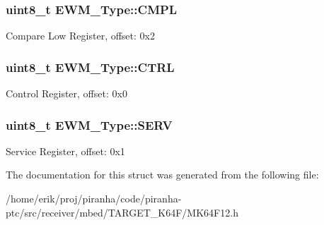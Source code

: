 \subsubsection[{\texorpdfstring{C\+M\+PL}{CMPL}}]{ uint8\+\_\+t E\+W\+M\+\_\+\+Type\+::\+C\+M\+PL}\hypertarget{structEWM__Type_a9b687b81f145fcac20991b7302df9f55}{}\label{structEWM__Type_a9b687b81f145fcac20991b7302df9f55}
Compare Low Register, offset\+: 0x2 
\subsubsection[{\texorpdfstring{C\+T\+RL}{CTRL}}]{ uint8\+\_\+t E\+W\+M\+\_\+\+Type\+::\+C\+T\+RL}\hypertarget{structEWM__Type_a34e0683325e0f6e1eff6c5429087c5b3}{}\label{structEWM__Type_a34e0683325e0f6e1eff6c5429087c5b3}
Control Register, offset\+: 0x0 
\subsubsection[{\texorpdfstring{S\+E\+RV}{SERV}}]{ uint8\+\_\+t E\+W\+M\+\_\+\+Type\+::\+S\+E\+RV}\hypertarget{structEWM__Type_a8b8265f982b05d0280305caedc159e37}{}\label{structEWM__Type_a8b8265f982b05d0280305caedc159e37}
Service Register, offset\+: 0x1 

The documentation for this struct was generated from the following file\+:\begin{DoxyCompactItemize}
\item 
/home/erik/proj/piranha/code/piranha-\/ptc/src/receiver/mbed/\+T\+A\+R\+G\+E\+T\+\_\+\+K64\+F/M\+K64\+F12.\+h\end{DoxyCompactItemize}
